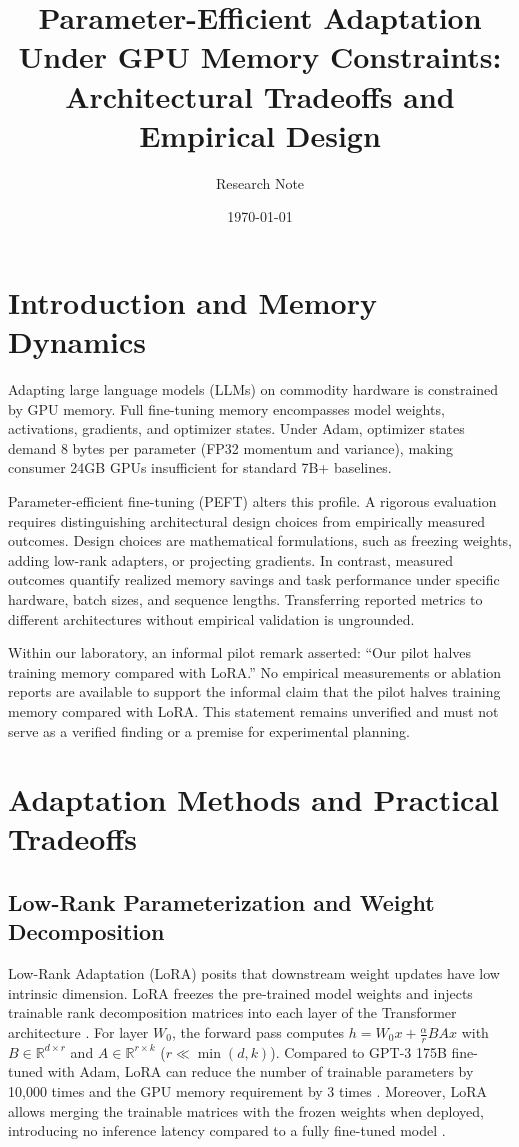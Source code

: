 \documentclass[11pt,a4paper]{article}
\title{\textbf{Parameter-Efficient Adaptation Under GPU Memory Constraints: Architectural Tradeoffs and Empirical Design}}
\author{Research Note}
\date{\today}
\begin{document}
\maketitle

\section{Introduction and Memory Dynamics}

Adapting large language models (LLMs) on commodity hardware is constrained by GPU memory. Full fine-tuning memory encompasses model weights, activations, gradients, and optimizer states. Under Adam, optimizer states demand 8 bytes per parameter (FP32 momentum and variance), making consumer 24GB GPUs insufficient for standard 7B+ baselines.

Parameter-efficient fine-tuning (PEFT) alters this profile. A rigorous evaluation requires distinguishing architectural design choices from empirically measured outcomes. Design choices are mathematical formulations, such as freezing weights, adding low-rank adapters, or projecting gradients. In contrast, measured outcomes quantify realized memory savings and task performance under specific hardware, batch sizes, and sequence lengths. Transferring reported metrics to different architectures without empirical validation is ungrounded.

Within our laboratory, an informal pilot remark asserted: ``Our pilot halves training memory compared with LoRA.'' No empirical measurements or ablation reports are available to support the informal claim that the pilot halves training memory compared with LoRA. This statement remains unverified and must not serve as a verified finding or a premise for experimental planning.

\section{Adaptation Methods and Practical Tradeoffs}

\subsection{Low-Rank Parameterization and Weight Decomposition}

Low-Rank Adaptation (LoRA) posits that downstream weight updates have low intrinsic dimension. LoRA freezes the pre-trained model weights and injects trainable rank decomposition matrices into each layer of the Transformer architecture \cite{hu2021lora}. For layer $W_0$, the forward pass computes $h = W_0 x + \frac{\alpha}{r}BAx$ with $B \in \mathbb{R}^{d \times r}$ and $A \in \mathbb{R}^{r \times k}$ ($r \ll \min(d, k)$). Compared to GPT-3 175B fine-tuned with Adam, LoRA can reduce the number of trainable parameters by 10,000 times and the GPU memory requirement by 3 times \cite{hu2021lora}. Moreover, LoRA allows merging the trainable matrices with the frozen weights when deployed, introducing no inference latency compared to a fully fine-tuned model \cite{hu2021lora}.
\end{document}
